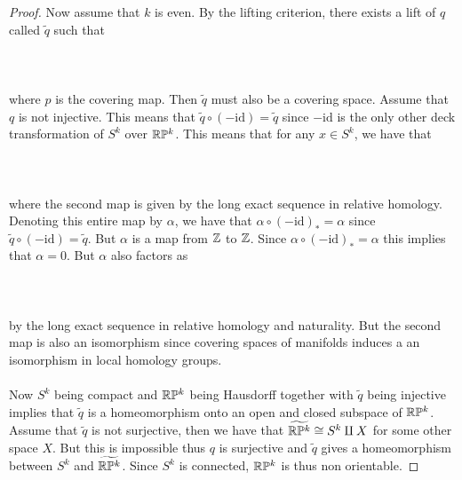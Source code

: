 \documentclass[a4paper]{article}
\begin{document}
\begin{prp}{}{}
\begin{proof}
Now assume that $k$ is even. By the lifting criterion, there exists a lift of $q$ called $\tilde{q}$ such that \\~\\
\\~\\
where $p$ is the covering map. Then $\tilde{q}$ must also be a covering space. Assume that $q$ is not injective. This means that $\tilde{q}\circ(-\text{id})=\tilde{q}$ since $-\text{id}$ is the only other deck transformation of $S^k$ over $\mathbb{R}\mathbb{P}^k$. This means that for any $x\in S^k$, we have that \\~\\
\\~\\
where the second map is given by the long exact sequence in relative homology. Denoting this entire map by $\alpha$, we have that $\alpha\circ(-\text{id})_\ast=\alpha$ since $\tilde{q}\circ(-\text{id})=\tilde{q}$. But $\alpha$ is a map from $\mathbb{Z}$ to $\mathbb{Z}$. Since $\alpha\circ(-\text{id})_\ast=\alpha$ this implies that $\alpha=0$. But $\alpha$ also factors as \\~\\
\\~\\
by the long exact sequence in relative homology and naturality. But the second map is also an isomorphism since covering spaces of manifolds induces a an isomorphism in local homology groups. \\~\\

Now $S^k$ being compact and $\mathbb{R}\mathbb{P}^k$ being Hausdorff together with $\tilde{q}$ being injective implies that $\tilde{q}$ is a homeomorphism onto an open and closed subspace of $\mathbb{R}\mathbb{P}^k$. Assume that $\tilde{q}$ is not surjective, then we have that $\widetilde{\mathbb{R}\mathbb{P}^k}\cong S^k\amalg X$ for some other space $X$. But this is impossible thus $q$ is surjective and $\tilde{q}$ gives a homeomorphism between $S^k$ and $\widetilde{\mathbb{R}\mathbb{P}^k}$. Since $S^k$ is connected, $\mathbb{R}\mathbb{P}^k$ is thus non orientable. 
\end{proof}
\end{prp}
\end{document}
